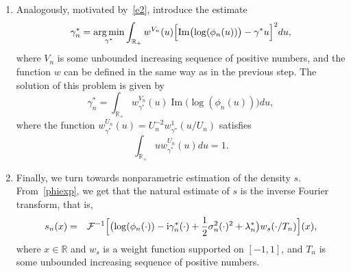 \documentclass[a4paper,11pt]{article}
\theoremstyle{definition}
\newcommand{\R}{{\mathbb{R}}}
\newcommand{\1}{\mathbb{I}}
\renewcommand{\i}{\mathrm{i}}
\def\R{\mathbb{R}}
\newcommand{\argmin}{\operatornamewithlimits{arg\,min}}
\renewcommand{\Im}{\operatorname{Im}}
\newcommand{\F}{\mathcal{F}}
\theoremstyle{remark}
\begin{document}
\begin{enumerate}
\begin{equation}
\end{equation}
where the function $w^{U_n}_{\lambda^*} (u) = U_n^{-1}w^{1}_{\lambda^*}(u/U_n)$ has the following properties
\begin{equation*}
    \int_{\R_+} -w^{U_n}_{\lambda^*}(u) du = 1, \qquad \int_{\R_+} \frac{u^2}{2} w^{U_n}_{\lambda^*}(u) du = 0.
\end{equation*}
 \item Analogously, motivated by~\eqref{e2}, introduce the estimate
 \begin{eqnarray}\label{gamma_opt}
\gamma^*_n
= \argmin_{\gamma^*} \int_{\R_+} w^{V_n}(u) 
\Bigl[
\Im\bigl(\log(\phi_n(u)) \bigr) 
-\gamma^* u
\Bigr]^2 du,
\end{eqnarray}
where \(V_n\) is some unbounded increasing sequence of positive numbers, and the function \(w\)  can be defined in the same way as in the previous step.
The solution of this problem is given by 
\begin{equation}\label{gamma_sol}
    \gamma^*_n = \int_{\R_+}w^{V_n}_{\gamma^*}(u) \Im\bigl(\log(\phi_n(u)) \bigr)du,
\end{equation}
where the function $w^{U_n}_{\gamma^*}(u)=U_n^{-2}w^{1}_{\gamma^*}(u/U_n)$ satisfies
\begin{equation*}
    \int_{\R_+} u w^{U_n}_{\gamma^*}(u) du = 1.
\end{equation*}
   
  \item Finally, we turn towards nonparametric estimation of the density \(s\). From~\eqref{phiexp}, we get that the natural estimate of \(s\) is the inverse Fourier transform, that is,
\begin{eqnarray}
\nonumber
s_n(x) 
&=& \F^{-1}\Bigl[\bigl(
\log(\phi_n(\cdot)) - \i \gamma^*_n(\cdot) +\frac{1}{2} \sigma_n^2 (\cdot)^2
 + \lambda^*_n \bigr)w_s(\cdot / T_n)\Bigr] (x), \label{p}
\end{eqnarray}
where $x \in \R$ and $w_s$ is a weight function supported on $[-1, 1]$, and  \(T_n\) is some unbounded increasing sequence of positive numbers.
\end{enumerate}
\end{document}
